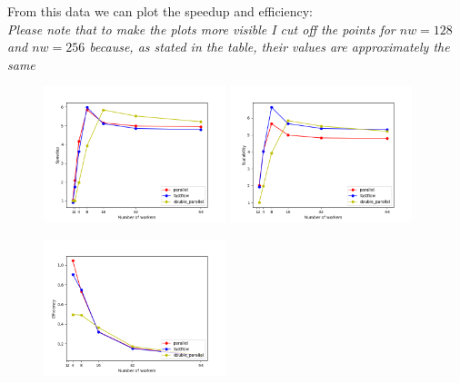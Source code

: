 \documentclass[12pt, letterpaper]{article}  %
\begin{document}
From this data we can plot the speedup and efficiency:\\
\textit{Please note that to make the plots more visible I cut off the points for $nw = 128$ and $nw = 256$ because, as stated in the table, their values are approximately the same}
\begin{figure}[]
    \centering
    \includegraphics[width=200px, keepaspectratio]{imgs/speedup.png}
    \includegraphics[width=200px, keepaspectratio]{imgs/scalability.png}
    \label{fig:speedup_scalability_plot}
\end{figure}


\begin{figure}[h!]
    \centering
    \includegraphics[width=200px, keepaspectratio]{imgs/efficiency.png}
    \label{fig:speedup_plot}
\end{figure}

\newpage
\end{document}
